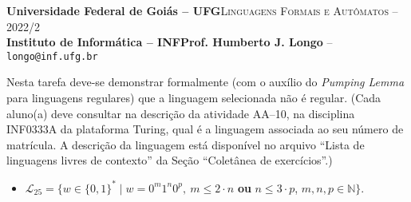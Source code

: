 \documentclass[12pt]{article}
\def\discente{Iury Alexandre Alves Bo}
\def\matricula{202103735}
\def\ua{10}
\def\myling{{25}} %
\begin{document}
 \begin{tcolorbox}[rounded corners, colback=blue!3, colframe=blue!40!black]
  \footnotesize\textbf{Universidade Federal de Goiás -- UFG}\hfill \textsc{Linguagens Formais e Autômatos -- 2022/2}\\
  \footnotesize\textbf{Instituto de Informática -- INF\hfill Prof. Humberto J. Longo} -- \scriptsize\texttt{longo@inf.ufg.br}
 \end{tcolorbox}\bigskip
%
\begin{tcolorbox}[rounded corners, colback=blue!2, colframe=blue!40!black, title=\textbf{Atividade AA-\ua}]
  Nesta tarefa deve-se demonstrar formalmente (com o auxílio do \emph{Pumping Lemma} para linguagens regulares) que a linguagem selecionada não é regular. (Cada aluno(a) deve consultar na descrição da atividade AA--\ua, na disciplina INF0333A da plataforma Turing, qual é a linguagem associada ao seu número de matrícula. A descrição da linguagem está disponível no arquivo ``Lista de linguagens livres de contexto'' da Seção ``Coletânea de exercícios''.)
\end{tcolorbox}\bigskip
%
\begin{tcolorbox}[rounded corners, colback=yellow!5, colframe=red!40!black, title={\discente\ (\matricula)}]
 \begin{itemize}[leftmargin=*]
  \item $\mathcal{L}_\myling = \{w\in\{0,1\}^*\mid w = 0^m1^n0^p,\ m \leqslant 2\cdot n$ \textbf{ou} $n \leqslant 3 \cdot p$,  $m, n, p \in \mathbb{N}\}$.
 \end{itemize}
\end{tcolorbox}\bigskip
\end{document}
